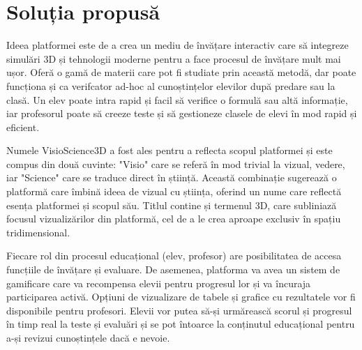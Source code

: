 

\section{Soluția propusă}
\label{sec:proj}
Ideea platformei este de a crea un mediu de învățare interactiv care să integreze
simulări 3D și tehnologii moderne pentru a face procesul de învățare mult mai ușor.
Oferă o gamă de materii care pot fi studiate prin această metodă, dar poate
funcționa și ca verifcator ad-hoc al cunoștințelor elevilor după predare sau la clasă. Un elev poate intra rapid
și facil să verifice o formulă sau altă informație, iar profesorul poate să creeze teste
și să gestioneze clasele de elevi în mod rapid și eficient.

Numele VisioScience3D a fost ales pentru a reflecta scopul platformei și este compus din două
cuvinte: "Visio" care se referă în mod trivial la vizual, vedere, iar "Science" care se traduce direct în știință.
Această combinație sugerează o platformă care îmbină ideea de vizual cu știința, oferind un nume
care reflectă esența platformei și scopul său. Titlul contine și termenul 3D, care subliniază
focusul vizualizărilor din platformă, cel de a le crea aproape exclusiv în spațiu tridimensional.

Fiecare rol din procesul educațional (elev, profesor) are posibilitatea de accesa 
funcțiile de învățare și evaluare. De asemenea, platforma va avea un sistem de gamificare care va recompensa
elevii pentru progresul lor și va încuraja participarea activă. Opțiuni de vizualizare de tabele și grafice
cu rezultatele vor fi disponibile pentru profesori. Elevii vor putea să-și urmărească scorul și 
progresul în timp real la teste și evaluări și se pot întoarce la conținutul educațional pentru
a-și revizui cunoștințele dacă e nevoie.

